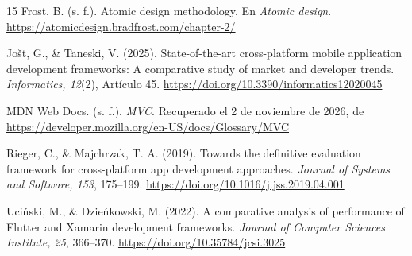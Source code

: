 \documentclass[12pt,letterpaper]{article}
\begin{document}
\begin{thebibliography}{15}
Frost, B. (s. f.). Atomic design methodology. En \textit{Atomic design}. \url{https://atomicdesign.bradfrost.com/chapter-2/}

Jo\v{s}t, G., \& Taneski, V. (2025). State-of-the-art cross-platform mobile application development frameworks: A comparative study of market and developer trends. \textit{Informatics, 12}(2), Artículo 45. \url{https://doi.org/10.3390/informatics12020045}

MDN Web Docs. (s. f.). \textit{MVC}. Recuperado el 2 de noviembre de 2026, de \url{https://developer.mozilla.org/en-US/docs/Glossary/MVC}

Rieger, C., \& Majchrzak, T. A. (2019). Towards the definitive evaluation framework for cross-platform app development approaches. \textit{Journal of Systems and Software, 153}, 175--199. \url{https://doi.org/10.1016/j.jss.2019.04.001}

Uci\'{n}ski, M., \& Dzie\'{n}kowski, M. (2022). A comparative analysis of performance of Flutter and Xamarin development frameworks. \textit{Journal of Computer Sciences Institute, 25}, 366--370. \url{https://doi.org/10.35784/jcsi.3025}

\end{thebibliography}
\end{document}
